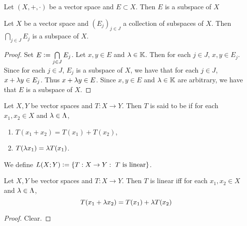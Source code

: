 \documentclass{book}
\begin{document}
 \begin{ex}
 	Let $(X, +, \cdot)$ be a vector space and $E \subset X$. Then $E$ is a subspace of $X$
 \end{ex}
 
 
 \begin{defn}
 	Let $X$ be a vector space and $(E_j)_{j \in J}$ a collection of subspaces of $X$. Then $\bigcap\limits_{j \in J}E_j$ is a subspace of $X$. 
 \end{defn}
 
 \begin{proof}
 	Set $E \vcentcolon= \bigcap\limits_{j \in J}E_j$. Let $x,y \in E$ and $\lambda \in \mathbb{K}$. Then for each $j \in J$, $x,y \in E_j$. Since for each $j \in J$, $E_j$ is a subspace of $X$, we have that for each $j \in J$, $x+ \lambda y \in E_j$. Thus $x+\lambda y \in E$. Since $x,y \in E$ and $\lambda \in \mathbb{K}$ are arbitrary,  we have that $E$ is a subspace of $X$. 
 \end{proof}
 
 
 
 
 
 
 
 
 
 
 
 
 
 
 
 
 
 
 
 
 
 
 
 
 
 
 \begin{defn}
 	Let $X, Y$ be vector spaces and $T:X \rightarrow Y$. Then $T$ is said to be  if for each $x_1, x_2 \in X$ and $\lambda \in \Lambda$, 
 	\begin{enumerate}
 		\item $T(x_1 + x_2) = T(x_1) + T(x_2)$,
 		\item $T(\lambda x_1) = \lambda T(x_1)$.
 	\end{enumerate}
 	We define $L(X;Y) \vcentcolon= \{T:X \rightarrow Y: \text{ $T$ is linear}\}$. 
 \end{defn}
 
 \begin{ex}
 	Let $X,Y$ be vector spaces and $T : X \rightarrow Y$. Then $T$ is linear iff for each $x_1, x_2 \in X$ and $\lambda \in \Lambda$, 
 	$$T(x_1 + \lambda x_2) = T(x_1) + \lambda T(x_2)$$
 \end{ex}
 
 \begin{proof}
 	Clear. 
 \end{proof}
 
\end{document}
